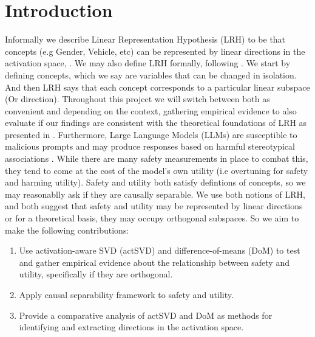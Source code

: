 \section{Introduction}
Informally we describe Linear Representation Hypothesis (LRH) to be that concepts (e.g Gender, Vehicle, etc)
can be represented by linear directions in the activation space, \citep{Mikolov2013LinguisticRI}. 
We may also define LRH formally, following \citet{park2023LRH}. We start by defining concepts, 
which we say are variables that can be changed in isolation.
And then LRH says that each concept corresponds to a particular linear subspace (Or direction).
Throughout this project we will switch between both as convenient and depending on the context,
gathering empirical evidence to also evaluate if our findings are consistent with the theoretical foundations
of LRH as presented in \citet{park2023LRH}. Furthermore, Large Language Models (LLMs) are susceptible 
to malicious prompts and may produce responses based on harmful stereotypical associations
\citet{jeoung-etal-2023-stereomap}. While there are many safety measurements in place to combat this, 
they tend to come at the cost of the model's own utility (i.e overtuning for safety and harming utility).
Safety and utility both satisfy \citet{park2023LRH} defintions of concepts, so we may reasonablly ask if they are
causally separable.
We use both notions of LRH, and both suggest that safety and utility may be represented by linear directions or for 
a theoretical basis, they may occupy orthogonal subspaces. So we aim to make the following contributions:
\begin{enumerate}
    \item Use activation-aware SVD (actSVD) and difference-of-means (DoM) to test and gather empirical evidence
    about the relationship between safety and utility, specifically if they are orthogonal.
    \item Apply \citet{park2023LRH} causal separability framework to safety and utility.
    \item Provide a comparative analysis of actSVD and DoM as methods for identifying 
    and extracting directions in the activation space. 
\end{enumerate}